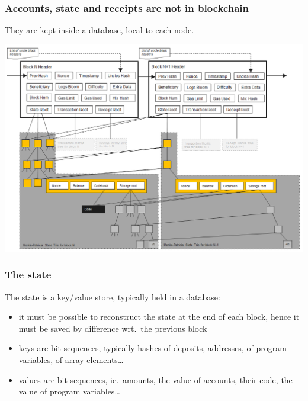 \documentclass[11pt]{beamer}  %
\begin{document}
\begin{frame}\frametitle{Accounts, state and receipts are \alert{not} in blockchain}

  They are kept inside a database, local to each node.

  \begin{center}
    \includegraphics[scale=0.38,clip=false]{pictures/accounts-state-receipts.png}
  \end{center}

\end{frame}

\begin{frame}\frametitle{The state}
  The state is a key/value store, typically held in a database:
  \begin{itemize}
  \item it must be possible to reconstruct the state at the end of
    each block, hence it must be saved by difference wrt.\ the previous block
  \item keys are bit sequences, typically hashes of deposits, addresses,
    of program variables, of array elements\ldots
  \item values are bit sequences, ie.\ amounts,
    the value of accounts, their code, the
    value of program variables\ldots
  \end{itemize}
\end{frame}
\end{document}
